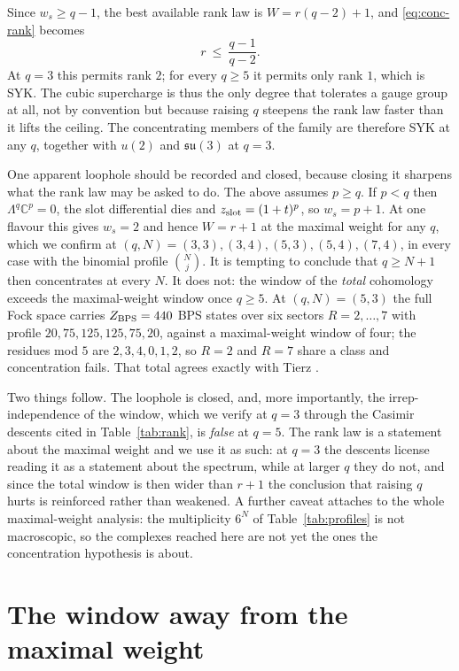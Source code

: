 \documentclass[10pt]{article}
\newcommand{\su}{\mathfrak{su}}
\begin{document}
Since $w_s\ge q-1$, the best available rank law is $W=r(q-2)+1$, and \eqref{eq:conc-rank} becomes
\begin{equation}
r\ \le\ \frac{q-1}{q-2}.
\end{equation}
At $q=3$ this permits rank $2$; for every $q\ge5$ it permits only rank $1$, which is SYK. The cubic supercharge
is thus the only degree that tolerates a gauge group at all, not by convention but because raising $q$ steepens
the rank law faster than it lifts the ceiling. The concentrating members of the family are therefore SYK at any
$q$, together with $u(2)$ and $\su(3)$ at $q=3$.

One apparent loophole should be recorded and closed, because closing it sharpens what the rank law may be asked
to do. The above assumes $p\ge q$. If $p<q$ then $\Lambda^q\mathbb C^p=0$, the slot differential dies and
$z_{\rm slot}=(1+t)^p$, so $w_s=p+1$. At one flavour this gives $w_s=2$ and hence $W=r+1$ at the maximal weight
for any $q$, which we confirm at $(q,N)=(3,3),(3,4),(5,3),(5,4),(7,4)$, in every case with the binomial profile
$\binom Nj$. It is tempting to conclude that $q\ge N+1$ then concentrates at every $N$. It does not: the window
of the \emph{total} cohomology exceeds the maximal-weight window once $q\ge5$. At $(q,N)=(5,3)$ the full Fock
space carries $Z_{\rm BPS}=440$ BPS states over six sectors $R=2,\dots,7$ with profile $20,75,125,125,75,20$,
against a maximal-weight window of four; the residues mod $5$ are $2,3,4,0,1,2$, so $R=2$ and $R=7$ share a
class and concentration fails. That total agrees exactly with Tierz \cite{Tierz}.

Two things follow. The loophole is closed, and, more importantly, the irrep-independence of the window, which we
verify at $q=3$ through the Casimir descents cited in Table~\ref{tab:rank}, is \emph{false} at $q=5$. The rank
law is a statement about the maximal weight and we use it as such: at $q=3$ the descents license reading it as a
statement about the spectrum, while at larger $q$ they do not, and since the total window is then wider than
$r+1$ the conclusion that raising $q$ hurts is reinforced rather than weakened. A further caveat attaches to the
whole maximal-weight analysis: the multiplicity $6^N$ of Table~\ref{tab:profiles} is not macroscopic, so the
complexes reached here are not yet the ones the concentration hypothesis is about.

\section{The window away from the maximal weight}\label{sec:allirreps}
\end{document}
